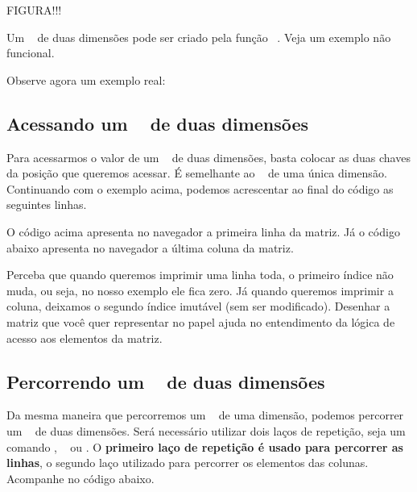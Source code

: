 FIGURA!!!

Um \tipoarray~ de duas dimensões pode ser criado pela função \comandoarray~. Veja um exemplo
não funcional.



Observe agora um exemplo real:



\subsection{Acessando um \tipoarray~ de duas dimensões}
\label{acessando-um-array-de-duas-dimensoes}

Para acessarmos o valor de um \tipoarray~ de duas dimensões, basta colocar as 
duas chaves da posição que queremos acessar. É semelhante ao \tipoarray~ de uma única dimensão.
Continuando com o exemplo acima, podemos acrescentar ao final do código as seguintes linhas.



O código acima apresenta no navegador a primeira linha da matriz. Já o código abaixo
apresenta no navegador a última coluna da matriz.



Perceba que quando queremos imprimir uma linha toda, o primeiro índice não muda, ou seja,
no nosso exemplo ele fica zero. Já quando queremos imprimir a coluna, deixamos o segundo
índice imutável (sem ser modificado). Desenhar a matriz que você quer representar no papel 
ajuda no entendimento da lógica de acesso aos elementos da matriz.

\subsection{Percorrendo um \tipoarray~ de duas dimensões}
\label{percorrendo-um-array-de-duas-dimensoes}

Da mesma maneira que percorremos um \tipoarray~ de uma dimensão, podemos percorrer um 
\tipoarray~ de duas dimensões. Será necessário utilizar dois laços de repetição, seja
um comando \comandofor, \comandowhile~ ou \comandoforeach. O \textbf{primeiro laço de repetição
é usado para percorrer as linhas}, o segundo laço utilizado para percorrer os elementos
das colunas. Acompanhe no código abaixo.

